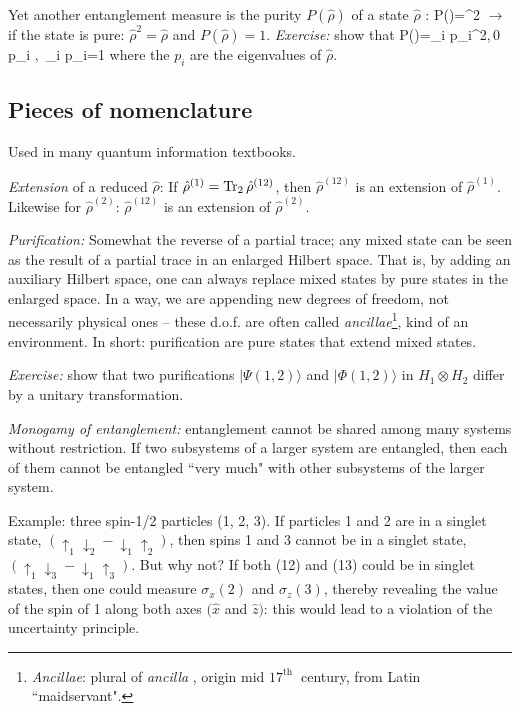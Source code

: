 \documentclass[12pt]{article}
\begin{document}
Yet another entanglement measure is the purity
\(P(\hat{\rho})\) of a state \(\hat{\rho}\) :
\be
P(\hat{\rho})=\Tr \hat{\rho}^{2}
\ee
$\rightarrow$ if the state is pure: $\hat{\rho}^2 = \hat{\rho}$ and $P(\hat{\rho}) = 1$.
\emph{Exercise:} show that
\be
P(\hat{\rho})=\sum_{i} p_{i}^{2},\,0 \leqslant p_{i} ,\, \sum_{i} p_{i}=1
\ee
where the $p_i$ are the eigenvalues of $\hat{\rho}$.


\subsection{Pieces of nomenclature}

Used in many quantum information textbooks.

\emph{Extension} of a reduced \(\hat{\rho}\): If \(\hat{\rho}^{(1)}=\Tr_{2} \hat{\rho}^{(12)}\), then \(\hat{\rho}^{(12)}\) is an extension
of \(\hat{\rho}^{(1)}\). Likewise for \(\hat{\rho}^{(2)}\): \(\hat{\rho}^{(12)}\) is an extension of \(\hat{\rho}^{(2)}\).


\emph{Purification:} Somewhat the reverse of a partial trace;
any mixed state can be seen as the result
of a partial trace in an enlarged Hilbert space.
That is, by adding an auxiliary Hilbert space,
one can always replace mixed states
by pure states in the enlarged space.
In a way, we are appending new degrees of
freedom, not necessarily physical ones
-- these \mbox{d.o.f.} are often called \emph{ancillae}\footnote{%
\textit{Ancillae}: plural of \textit{ancilla} , origin mid \(17^{\text {th }}\) century,
from Latin ``maidservant".%
},
kind of an environment.
In short: purification are pure states that extend mixed states.


\emph{Exercise:} show that two purifications \(|\Psi(1,2)\rangle\) and
\(|\Phi(1,2)\rangle\) in \(H_{1} \otimes H_{2}\) differ by a unitary
transformation.

\emph{Monogamy of entanglement:} entanglement cannot be shared among many systems without restriction.
If two subsystems of a larger system are
entangled, then each of them cannot be
entangled ``very much" with other subsystems
of the larger system.

Example: three spin-1/2 particles (1, 2, 3).
If particles 1 and 2 are in a singlet state,
\(\left(\uparrow_{1} \downarrow_{2}-\downarrow_{1} \uparrow_{2}\right)\), 
then spins 1 and 3 cannot be in a singlet state, 
\(\left(\uparrow_{1} \downarrow_{3}-\downarrow_{1} \uparrow_{3}\right)\).
But why not?
If both (12) and (13) could be
in singlet states, then one could
measure \(\sigma_{x}(2)\) and \(\sigma_{z}(3)\), thereby
revealing the value of the spin of 1
along both axes \((\hat{x}\) and \(\hat{z})\):
this would lead to a violation of the uncertainty principle.
\end{document}
